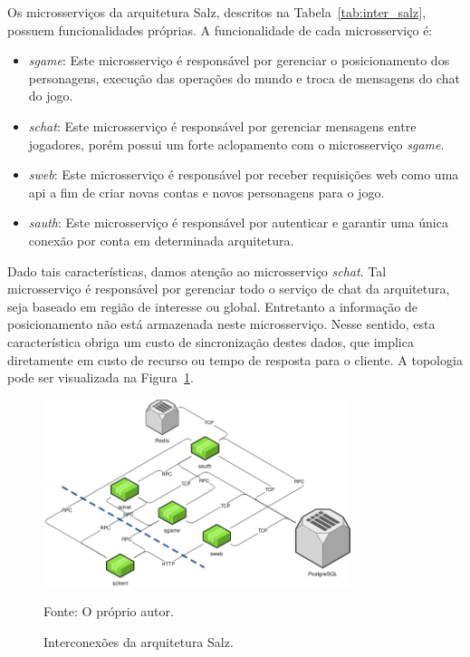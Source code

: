 Os microsserviços da arquitetura Salz, descritos na Tabela~\ref{tab:inter_salz}, possuem funcionalidades próprias.
%
A funcionalidade de cada microsserviço é:



\begin{itemize}
  \item \textit{sgame}: Este microsserviço é responsável por gerenciar o posicionamento dos personagens, execução das operações do mundo e troca de mensagens do chat do jogo.
  \item \textit{schat}: Este microsserviço é responsável por gerenciar mensagens entre jogadores, porém possui um forte aclopamento com o microsserviço \textit{sgame}.
  \item \textit{sweb}: Este microsserviço é responsável por receber requisições web como uma \ac{api} a fim de criar novas contas e novos personagens para o jogo.
  \item \textit{sauth}: Este microsserviço é responsável por autenticar e garantir uma única conexão por conta em determinada arquitetura.
\end{itemize}



Dado tais características, damos atenção ao microsserviço \textit{schat}.
%
Tal microsserviço é responsável por gerenciar todo o serviço de chat da arquitetura, seja baseado em região de interesse ou global.
%
Entretanto a informação de posicionamento não está armazenada neste microsserviço.
%
Nesse sentido, esta característica obriga um custo de sincronização destes dados, que implica diretamente em custo de recurso ou tempo de resposta para o cliente.
%
A topologia pode ser visualizada na Figura~\ref{fig:interconexao_salz}.



\begin{figure}[htb!]
  \caption{Interconexões da arquitetura Salz.}
  \label{fig:interconexao_salz}
  \includegraphics[width=0.8\textwidth]{figuras/interconexoes/salz.png}
  \centering

  Fonte: O próprio autor.
\end{figure}



